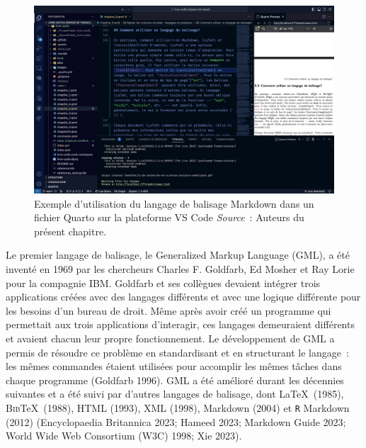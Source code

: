 \documentclass[
  letterpaper,
]{scrbook}
\begin{document}
\begin{figure}

{\centering \includegraphics[width=4.8in,height=\textheight]{images/chapitre5_vscode.png}

}

\caption{\label{fig-vscode}Exemple d'utilisation du langage de balisage
Markdown dans un fichier Quarto sur la plateforme VS Code
\newline \textit{Source}~: Auteurs du présent chapitre.}

\end{figure}

Le premier langage de balisage, le Generalized Markup Language (GML), a
été inventé en 1969 par les chercheurs Charles F. Goldfarb, Ed Mosher et
Ray Lorie pour la compagnie IBM. Goldfarb et ses collègues devaient
intégrer trois applications créées avec des langages différents et avec
une logique différente pour les besoins d'un bureau de droit. Même après
avoir créé un programme qui permettait aux trois applications
d'interagir, ces langages demeuraient différents et avaient chacun leur
propre fonctionnement. Le développement de GML a permis de résoudre ce
problème en standardisant et en structurant le langage~: les mêmes
commandes étaient utilisées pour accomplir les mêmes tâches dans chaque
programme (Goldfarb 1996). GML a été amélioré durant les décennies
suivantes et a été suivi par d'autres langages de balisage, dont
\LaTeX~(1985), \textsc{Bib}\TeX~(1988), HTML (1993), XML (1998),
Markdown (2004) et \texttt{R} Markdown (2012) (Encyclopaedia Britannica
2023; Hameed 2023; Markdown Guide 2023; World Wide Web Consortium (W3C)
1998; Xie 2023).
\end{document}
